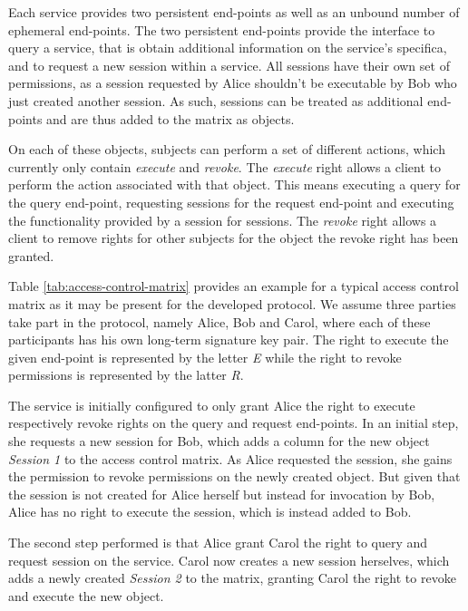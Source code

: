 Each service provides two persistent end-points as well as an unbound number of ephemeral end-points.
The two persistent end-points provide the interface to query a service, that is obtain additional information on the service's specifica, and to request a new session within a service.
All sessions have their own set of permissions, as a session requested by Alice shouldn't be executable by Bob who just created another session.
As such, sessions can be treated as additional end-points and are thus added to the matrix as objects.

On each of these objects, subjects can perform a set of different actions, which currently only contain \emph{execute} and \emph{revoke}.
The \emph{execute} right allows a client to perform the action associated with that object.
This means executing a query for the query end-point, requesting sessions for the request end-point and executing the functionality provided by a session for sessions.
The \emph{revoke} right allows a client to remove rights for other subjects for the object the revoke right has been granted.

Table \ref{tab:access-control-matrix} provides an example for a typical access control matrix as it may be present for the developed protocol.
We assume three parties take part in the protocol, namely Alice, Bob and Carol, where each of these participants has his own long-term signature key pair.
The right to execute the given end-point is represented by the letter \emph{E} while the right to revoke permissions is represented by the latter \emph{R}.

The service is initially configured to only grant Alice the right to execute respectively revoke rights on the query and request end-points.
In an initial step, she requests a new session for Bob, which adds a column for the new object \emph{Session 1} to the access control matrix.
As Alice requested the session, she gains the permission to revoke permissions on the newly created object.
But given that the session is not created for Alice herself but instead for invocation by Bob, Alice has no right to execute the session, which is instead added to Bob.

The second step performed is that Alice grant Carol the right to query and request session on the service.
Carol now creates a new session herselves, which adds a newly created \emph{Session 2} to the matrix, granting Carol the right to revoke and execute the new object.

